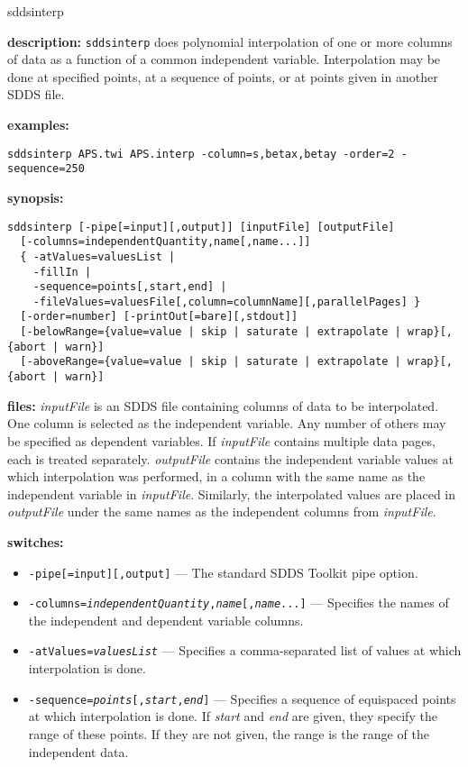 \begin{sddsprog}{sddsinterp}
  \item \textbf{description:}
  \verb|sddsinterp| does polynomial interpolation of one or more columns of data as a function of a common independent variable. Interpolation may be done at specified points, at a sequence of points, or at points given in another SDDS file.
  \item \textbf{examples:}
\begin{verbatim}
sddsinterp APS.twi APS.interp -column=s,betax,betay -order=2 -sequence=250
\end{verbatim}
  \item \textbf{synopsis:}
\begin{verbatim}
sddsinterp [-pipe[=input][,output]] [inputFile] [outputFile]
  [-columns=independentQuantity,name[,name...]]
  { -atValues=valuesList |
    -fillIn |
    -sequence=points[,start,end] |
    -fileValues=valuesFile[,column=columnName][,parallelPages] }
  [-order=number] [-printOut[=bare][,stdout]]
  [-belowRange={value=value | skip | saturate | extrapolate | wrap}[,{abort | warn}]
  [-aboveRange={value=value | skip | saturate | extrapolate | wrap}[,{abort | warn}]
\end{verbatim}
  \item \textbf{files:}
  \emph{inputFile} is an SDDS file containing columns of data to be interpolated. One column is selected as the independent variable. Any number of others may be specified as dependent variables. If \emph{inputFile} contains multiple data pages, each is treated separately. \emph{outputFile} contains the independent variable values at which interpolation was performed, in a column with the same name as the independent variable in \emph{inputFile}. Similarly, the interpolated values are placed in \emph{outputFile} under the same names as the independent columns from \emph{inputFile}.
  \item \textbf{switches:}
    \begin{itemize}
      \item \verb|-pipe[=input][,output]| --- The standard SDDS Toolkit pipe option.
      \item {\tt -columns={\em independentQuantity},{\em name}[,{\em name}...]} --- Specifies the names of the independent and dependent variable columns.
      \item {\tt -atValues={\em valuesList}} --- Specifies a comma-separated list of values at which interpolation is done.
      \item {\tt -sequence={\em points}[,{\em start},{\em end}]} --- Specifies a sequence of equispaced points at which interpolation is done. If {\em start} and {\em end} are given, they specify the range of these points. If they are not given, the range is the range of the independent data.

\end{itemize}
\end{sddsprog}
